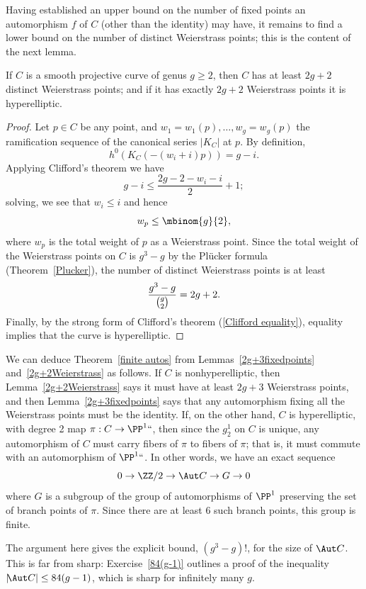 Having established an upper  bound on the number of fixed points an
automorphism $f$ of $C$ (other than the identity) may have, it remains
to find a lower bound on the number of distinct Weierstrass points;
this is the content of the next lemma.


\begin{lemma}\label{2g+2Weierstrass}
If $C$ is a smooth projective curve of genus $g \geq 2$, then $C$ has at
least $2g+2$ distinct Weierstrass points; and if it has exactly $2g+2$
%
%
Weierstrass points it is 
hyperelliptic.
\end{lemma}

\begin{proof}
Let $p \in C$ be any point, and $w_1=w_1(p),\dots,w_g = w_g(p)$
the ramification sequence of the canonical series $|K_C|$ at $p$. By
definition,
$$
h^0(K_C(-(w_i+i)p)) = g - i.
$$
Applying Clifford's theorem we have
$$
g-i \leq \frac{2g - 2 - w_i - i}{2} + 1;
$$
solving, we see that
$
w_i \leq i
$
and hence
$$
w_p \leq \mbinom{g}{2}
,
$$
where $w_p$ is the total weight of $p$ as a Weierstrass point. Since the
total weight of the Weierstrass points on $C$ is $g^3-g$ by the Pl\"ucker
formula (Theorem~\ref{Plucker}), the number of distinct Weierstrass points
is at least
$$
\frac{g^3-g}{\tbinom{g}{2}} = 2g+2.
$$
Finally, by the strong form of 
Clifford's theorem
%
(\ref{Clifford
equality}), equality implies that the curve is hyperelliptic.
\end{proof}

We can deduce Theorem~\ref{finite autos} from Lemmas~\ref{2g+3fixedpoints}
and~\ref{2g+2Weierstrass} as follows. If $C$ is 
nonhyperelliptic, 
then
%
Lemma~\ref{2g+2Weierstrass} says it must have at least $2g+3$ Weierstrass
points, and then Lemma~\ref{2g+3fixedpoints} says that any automorphism
fixing all the Weierstrass points must be the identity. If, on the other
%
hand, $C$ is hyperelliptic, with degree 2 map $\pi : C \to \PP^1` `$,
then since the $g^1_2$ on $C$ is unique, any automorphism of $C$ must
carry fibers of $\pi$ to fibers of $\pi$; that is, it must commute with
an automorphism of $\PP^1` `$. In other words, we have an exact sequence
$$
0 \to \ZZ/2 \to \Aut C \to G \to 0
$$
where $G$ is a subgroup of the group of automorphisms of $\PP^1$
preserving  the set of branch points of $\pi$. Since there are at least
6 such branch points, this group is finite.

The argument here gives the explicit bound,
$(g^3-g)!$,
for the size
of $\Aut C$. This is far from sharp:
Exercise~\ref{84(g-1)} 
outlines a proof of
the inequality
$|\!\Aut C| \leq 84(g-1)$, which is 
sharp for infinitely many $g$.


